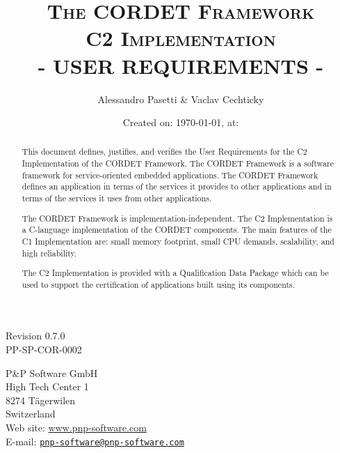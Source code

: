 \documentclass[a4paper,10pt]{article}
\title{\textsc{The CORDET Framework} \\ \textsc{C2 Implementation} \\ \textsc{- USER REQUIREMENTS -}}
\author{Alessandro Pasetti \& Vaclav Cechticky}
\date{Created on: \today{}, at: \currenttime{}}
\newcommand{\docIssue}{0.7.0}						%
\newcommand{\docRefNumber}{PP-SP-COR-0002}		%
\begin{document}
\maketitle

\begin{center}
Revision \docIssue{} \\
\docRefNumber{}
\end{center}

\begin{center}
P\&P Software GmbH \\
High Tech Center 1 \\
8274 T\"{a}gerwilen \\
Switzerland \\
\vspace{2mm}
Web site: \url{www.pnp-software.com}\\
E-mail: \href{mailto:pnp-software@pnp-software.com}{\nolinkurl{pnp-software@pnp-software.com}} 
\end{center}


\begin{table}[ht]
\begin{center}
\begin{tabular}{p{11.7cm}}
\\
\hline
\end{tabular}
\end{center}
\end{table}
\begin{abstract}
This document defines, justifies, and verifies the User Requirements for the C2 Implementation of the CORDET Framework. The CORDET Framework is a software framework for service-oriented embedded applications. The CORDET Framework defines an application in terms of the services it provides to other applications and in terms of the services it uses from other applications.
\par
The CORDET Framework is implementation-independent. The C2 Implementation is a C-language implementation of the CORDET components. The main features of the C1 Implementation are: small memory footprint, small CPU demands, scalability, and high reliability.
\par 
The C2 Implementation is provided with a Qualification Data Package which can be used to support the certification of applications built using its components.
\end{abstract}
\begin{table}[ht]
\begin{center}
\begin{tabular}{p{11.7cm}}
\\
\hline
\end{tabular}
\end{center}
\end{table}
\end{document}
